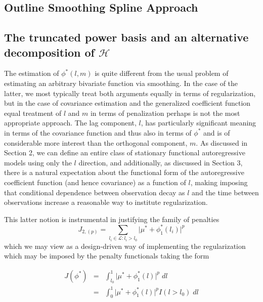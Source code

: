 \documentclass[12pt]{article}
\theoremstyle{definition}
\begin{document}
\subsection{Outline Smoothing Spline Approach}

\subsection{The truncated power basis and an alternative decomposition of $\mathcal{H}$}

The estimation of $\phi^*\left(l,m\right)$ is quite different from the usual problem of estimating an arbitrary bivariate function via smoothing. In the case of the latter, we most typically treat both arguments equally in terms of regularization, but in the case of covariance estimation and the generalized coefficient function equal treatment of $l$ and $m$ in terms of penalization perhaps is not the most appropriate approach. The lag component, $l$, has particularly significant meaning in terms of the covariance function and thus also in terms of $\phi^*$ and is of considerable more interest than the orthogonal component, $m$. As discussed in Section 2, we can define an entire class of stationary functional autoregressive models using only the $l$ direction, and additionally, as discussed in Section 3, there is a natural expectation about the functional form of the autoregressive coefficient function (and hence covariance) as a function of $l$, making imposing that conditional dependence between observation decay as $l$ and the time between observations increase a reasonable way to institute regularization.

This latter notion is instrumental in justifying the family of penalties
\[
J_{2,\left(p\right)} = \sum_{  l_i \in \mathcal{L}: l_i > l_0} \vert \mu^* + \phi^*_1\left(l_i\right) \vert^p 
\]
\noindent
which we may view as a design-driven way of implementing the regularization which may be imposed by the penalty functionals taking the form

\begin{eqnarray} \nonumber
J\left(\phi^*\right) &=& \int_{l_0}^1 \vert \mu^* + \phi^*_1\left(l\right) \vert^p\; dl\\
&=& \int_{0}^1 \vert \mu^* + \phi^*_1\left(l\right) \vert^p I\left(l > l_0\right) \; dl \label{eq:truncated_penalty}
\end{eqnarray}
\end{document}
